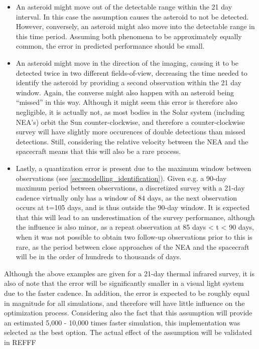 \begin{itemize}
 \item An asteroid might move out of the detectable range within the 21 day interval. In this case the assumption causes the asteroid to not be detected. However, conversely, an asteroid might also move into the detectable range in this time period. Assuming both phenomena to be approximately equally common, the error in predicted performance should be small.
 \item An asteroid might move in the direction of the imaging, causing it to be detected twice in two different fields-of-view, decreasing the time needed to identify the asteroid by providing a second observation within the 21 day window. Again, the converse might also happen with an asteroid being ``missed'' in this way. Although it might seem this error is therefore also negligible, it is actually not, as most bodies in the Solar system (including NEA's) orbit the Sun counter-clockwise, and therefore a counter-clockwise survey will have slightly more occurences of double detections than missed detections. Still, considering the relative velocity between the NEA and the spacecraft means that this will also be a rare process.
 \item Lastly, a quantization error is present due to the maximum window between observations (see \autoref{sec:modelling_identification}). Given e.g. a 90-day maximum period between observations, a discretized survey with a 21-day cadence virtually only has a window of 84 days, as the next observation occurs at t=105 days, and is thus outside the 90-day window. It is expected that this will lead to an underestimation of the survey performance, although the influence is also minor, as a repeat observation at 85 days < t < 90 days, when it was not possible to obtain two follow-up observations prior to this is rare, as the period between close approaches of the NEA and the spacecraft will be in the order of hundreds to thousands of days.
\end{itemize}
Although the above examples are given for a 21-day thermal infrared survey, it is also of note that the error will be significantly smaller in a visual light system due to the faster cadence. In addition, the error is expected to be roughly equal in magnitude for all simulations, and therefore will have little influence on the optimization process. Considering also the fact that this assumption will provide an estimated 5,000 - 10,000 times faster simulation, this implementation was selected as the best option. The actual effect of the assumption will be validated in REFFF


